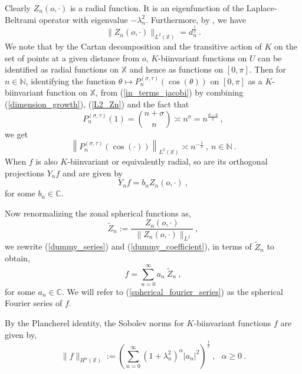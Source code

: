 \documentclass[12pt]{amsart}
\theoremstyle{definition}
\newcommand{\C}{\mathbb C}%
\newcommand{\N}{\mathbb N}%
\newcommand{\X}{\mathbb X}%
\numberwithin{equation}{section}
\begin{document}
Clearly $Z_n(o,\cdot)$ is a radial function. It is an eigenfunction of the Laplace-Beltrami operator with eigenvalue $-\lambda^2_n$. Furthermore, by \cite[Remark 3.5]{Pasquale}, we have
\begin{equation}\label{L2_Zn}
\|Z_n(o,\cdot)\|_{L^2(\X)}=d^{\frac{1}{2}}_n\:.
\end{equation}
We note that by the Cartan decomposition and the transitive action of $K$ on the set of points at a given distance from $o$, $K$-biinvariant functions on $U$ can be identified as radial functions on $\X$ and hence as functions on $[0,\pi]$. Then for $n \in \N$, identifying the function $\theta \mapsto P^{(\sigma,\tau)}_n{\left(\cos(\theta)\right)}$ on $[0,\pi]$ as a $K$-biinvariant function on $\X$, from (\ref{in_terms_jacobi}) by combining (\ref{dimension_growth}), (\ref{L2_Zn}) and the fact that $$P^{(\sigma,\tau)}_n(1) = {n+\sigma \choose n} \asymp n^\sigma=n^{\frac{d-2}{2}}\:,$$
we get
\begin{equation} \label{jacobi_poly_L2}
\left\|P^{(\sigma,\tau)}_n{\left(\cos(\cdot)\right)}\right\|_{L^2(\X)} \asymp n^{-\frac{1}{2}}\:,\:n \in \N\:.
\end{equation}
When $f$ is also $K$-biinvariant or equivalently radial, so are its orthogonal projections $Y_nf$ and are given by
\begin{equation} \label{dummy_coefficient}
Y_nf=b_nZ_n(o,\cdot)\:,
\end{equation}
for some $b_n \in \C$. 

Now renormalizing the zonal spherical functions as,
\begin{equation} \label{normalization}
\tilde{Z}_n := \frac{Z_n(o,\cdot)}{\:\:\|Z_n(o,\cdot)\|_{L^2}}\:,
\end{equation}
we rewrite (\ref{dummy_series}) and (\ref{dummy_coefficient}), in terms of $\tilde{Z}_n$ to obtain,
\begin{equation} \label{spherical_fourier_series}
f=\sum_{n=0}^\infty a_n\:\tilde{Z}_n\:,
\end{equation}
for some $a_n \in \C$\:. We will refer to (\ref{spherical_fourier_series}) as the spherical Fourier series of $f$. 

By the Plancherel identity, the Sobolev norms for $K$-biinvariant functions $f$ are given by,
\begin{equation*}
\|f\|_{H^\alpha(\X)}:=\left(\sum_{n=0}^\infty {(1+\lambda^2_n)}^\alpha \left|a_n\right|^2 \right)^{\frac{1}{2}}\:,\:\:\:\alpha \ge 0\:.
\end{equation*} 
\end{document}
